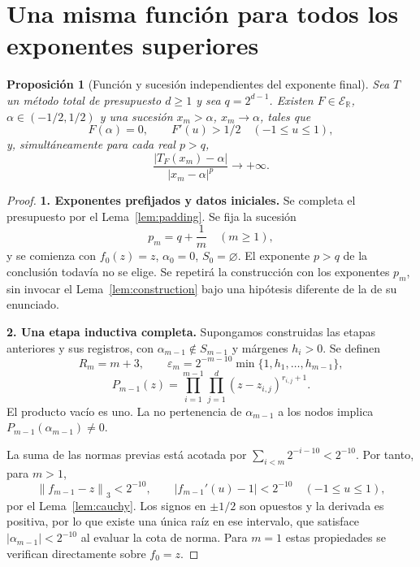 \documentclass[11pt,a4paper]{article}
\numberwithin{equation}{section}
\newtheorem{proposition}[theorem]{Proposición}
\theoremstyle{definition}
\theoremstyle{remark}
\newcommand{\R}{\mathbb R}
\newcommand{\ER}{\mathcal E_{\R}}
\newcommand{\norm}[1]{\left\lVert#1\right\rVert}
\newcommand{\paso}[1]{\par\smallskip\noindent\textbf{#1}\quad}
\begin{document}
\clearpage
\section{Una misma función para todos los exponentes superiores}\label{app:allp}

\begin{proposition}[Función y sucesión independientes del exponente final]\label{prop:allp}
Sea $T$ un método total de presupuesto $d\ge1$ y sea $q=2^{d-1}$. Existen $F\in\ER$, $\alpha\in(-1/2,1/2)$ y una sucesión $x_m>\alpha$, $x_m\to\alpha$, tales que
\[
F(\alpha)=0,\qquad F'(u)>1/2\quad(-1\le u\le1),
\]
y, simultáneamente para cada real $p>q$,
\[
\frac{|T_F(x_m)-\alpha|}{|x_m-\alpha|^p}\longrightarrow+\infty.
\]
\end{proposition}
\begin{proof}
\paso{1. Exponentes prefijados y datos iniciales.}
Se completa el presupuesto por el Lema~\ref{lem:padding}. Se fija la sucesión
\[
p_m=q+\frac1m\quad(m\ge1),
\]
y se comienza con $f_0(z)=z$, $\alpha_0=0$, $S_0=\varnothing$. El exponente $p>q$ de la conclusión todavía no se elige. Se repetirá la construcción con los exponentes $p_m$, sin invocar el Lema~\ref{lem:construction} bajo una hipótesis diferente de la de su enunciado.

\paso{2. Una etapa inductiva completa.}
Supongamos construidas las etapas anteriores y sus registros, con $\alpha_{m-1}\notin S_{m-1}$ y márgenes $h_i>0$. Se definen
\[
R_m=m+3,\qquad
\varepsilon_m=2^{-m-10}\min\{1,h_1,\ldots,h_{m-1}\},
\]
\[
P_{m-1}(z)=\prod_{i=1}^{m-1}\prod_{j=1}^d(z-z_{i,j})^{r_{i,j}+1}.
\]
El producto vacío es uno. La no pertenencia de $\alpha_{m-1}$ a los nodos implica $P_{m-1}(\alpha_{m-1})\ne0$.

La suma de las normas previas está acotada por $\sum_{i<m}2^{-i-10}<2^{-10}$. Por tanto, para $m>1$,
\[
\norm{f_{m-1}-z}_3<2^{-10},\qquad
|f_{m-1}'(u)-1|<2^{-10}\quad(-1\le u\le1),
\]
por el Lema~\ref{lem:cauchy}. Los signos en $\pm1/2$ son opuestos y la derivada es positiva, por lo que existe una única raíz en ese intervalo, que satisface $|\alpha_{m-1}|<2^{-10}$ al evaluar la cota de norma. Para $m=1$ estas propiedades se verifican directamente sobre $f_0=z$.


\end{proof}
\end{document}
